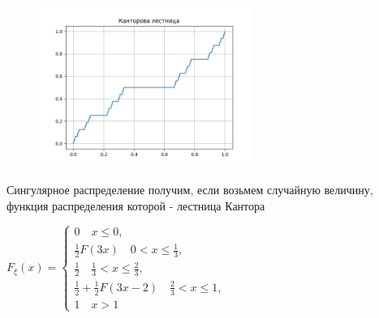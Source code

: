 \documentclass[12pt]{article}
\begin{document}
    \smallvspace
    
    \begin{minipage}{\textwidth}
        \begin{figure}
            \includegraphics[width=7cm]{probtheory/images/probtheory_2024_10_22_1}
        \end{figure}







        \Exs Сингулярное распределение получим, если возьмем случайную величину, функция распределения которой - 
        лестница Кантора
    
        $F_\xi(x) = \begin{cases}0 \quad x \leq 0, \\ \frac{1}{2}F(3x) \quad 0 < x \leq \frac{1}{3}, \\ \frac{1}{2} \quad \frac{1}{3} < x \leq \frac{2}{3}, \\ \frac{1}{2} + \frac{1}{2}F(3x - 2) \quad \frac{2}{3} < x \leq 1, \\ 1 \quad x > 1\end{cases}$
    \end{minipage}
\end{document}
